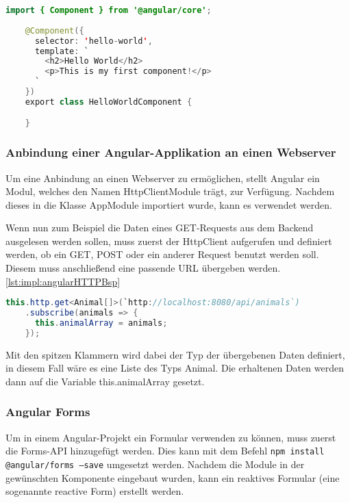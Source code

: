 \begin{lstlisting}[language=java,caption=Beispiel für eine minimierte Angular Komponente,label=lst:impl:angularBsp]
    import { Component } from '@angular/core';
 
    @Component({
      selector: 'hello-world',
      template: `
        <h2>Hello World</h2>
        <p>This is my first component!</p>
      `
    })
    export class HelloWorldComponent {

    }
\end{lstlisting}
\cite{angularOfficialSite}
 
\subsubsection{Anbindung einer Angular-Applikation an einen Webserver}
Um eine Anbindung an einen Webserver zu ermöglichen, stellt Angular ein Modul, welches den Namen HttpClientModule trägt, zur Verfügung. Nachdem dieses in die Klasse AppModule importiert wurde, kann es verwendet werden.
 
Wenn nun zum Beispiel die Daten eines GET-Requests aus dem Backend ausgelesen werden sollen, muss zuerst der HttpClient aufgerufen und definiert werden, ob ein GET, POST oder ein anderer Request benutzt werden soll. Diesem muss anschließend eine passende URL übergeben werden. \ref{lst:impl:angularHTTPBsp}
 
\begin{lstlisting}[language=java,caption=Beispiel für einen GET-Request,label=lst:impl:angularHTTPBsp]
  this.http.get<Animal[]>(`http://localhost:8080/api/animals`)
    .subscribe(animals => {
      this.animalArray = animals;
    });
\end{lstlisting}
 
Mit den spitzen Klammern wird dabei der Typ der übergebenen Daten definiert, in diesem Fall wäre es eine Liste des Typs Animal. Die erhaltenen Daten werden dann auf die Variable this.animalArray gesetzt. \cite{angularHandbuchBuch}
 
\subsubsection{Angular Forms}
Um in einem Angular-Projekt ein Formular verwenden zu können, muss zuerst die Forms-API hinzugefügt werden. Dies kann mit dem Befehl \texttt{npm install @angular/forms --save} umgesetzt werden. Nachdem die Module in der gewünschten Komponente eingebaut wurden, kann ein reaktives Formular (eine sogenannte reactive Form) erstellt werden.
 
